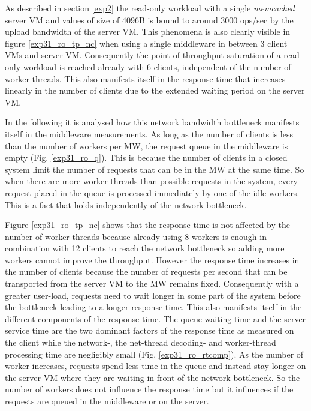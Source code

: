 \documentclass[report.tex]{subfiles}
\begin{document}
As described in section \ref{exp2} the read-only workload with a single \emph{memcached} server VM and values of size of 4096B is bound to around 3000 ops/sec by the upload bandwidth of the server VM. This phenomena is also clearly visible in figure \ref{exp31_ro_tp_nc} when using a single middleware in between 3 client VMs and server VM. Consequently the point of throughput saturation of a read-only workload is reached already with 6 clients, independent of the number of worker-threads. This also manifests itself in the response time that increases linearly in the number of clients due to the extended waiting period on the server VM.

In the following it is analysed how this network bandwidth bottleneck manifests itself in the middleware measurements. 
As long as the number of clients is less than the number of workers per MW, the request queue in the middleware is empty (Fig. \ref{exp31_ro_q}). This is because the number of clients in a closed system limit the number of requests that can be in the MW at the same time. 
So when there are more worker-threads than possible requests in the system, every request placed in the queue is processed immediately by one of the idle workers. This is a fact that holds independently of the network bottleneck. 

Figure \ref{exp31_ro_tp_nc} shows that the response time is not affected by the number of worker-threads because already using 8 workers is enough in combination with 12 clients to reach the network bottleneck so adding more workers cannot improve the throughput. 
However the response time increases in the number of clients because the number of requests per second that can be transported from the server VM to the MW remains fixed. Consequently with a greater user-load, requests need to wait longer in some part of the system before the bottleneck leading to a longer response time.
This also manifests itself in the different components of the response time.
The queue waiting time and the server service time are the two dominant factors of the response time as measured on the client while the network-, the net-thread decoding- and worker-thread processing time are negligibly small  (Fig. \ref{exp31_ro_rtcomp}). As the number of worker increases, requests spend less time in the queue and instead stay longer on the server VM where they are waiting in front of the network bottleneck. 
So the number of workers does not influence the response time but it influences if the requests are queued in the middleware or on the server.
\end{document}
